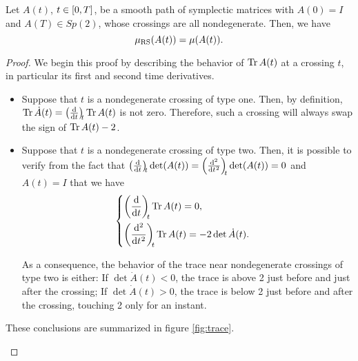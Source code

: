 \begin{prop}
Let $A(t)$, $t \in \interval0T$, be a smooth path of symplectic matrices with $A(0) = I$ and $A(T) \in Sp(2)$, whose crossings are all nondegenerate. Then, we have
\begin{equation}
\mu_{\mathrm{RS}}(A(t)) = \mu(A(t)).
\end{equation}
\end{prop}

\begin{proof}
We begin this proof by describing the behavior of $\operatorname{Tr} A(t)$ at a crossing $t$, in particular its first and second time derivatives.

\begin{itemize}
\item Suppose that $t$ is a nondegenerate crossing of type one. Then, by definition, $\trace \dot A(t) = \diff{}t[t] \trace A(t)$ is not zero. Therefore, such a crossing will always swap the sign of $\operatorname{Tr} A(t) - 2$.

\item Suppose that $t$ is a nondegenerate crossing of type two. Then, it is possible to verify from the fact that $\diff{}t[t] \det(A(t)) = \diff[2]{}t[t] \det(A(t)) = 0$ and $A(t) = I$ that we have
\begin{equation}
\begin{cases}
\displaystyle \diff{}t[t] \trace A(t) = 0,\\[1em]
\displaystyle \diff[2]{}t[t] \trace A(t) = - 2 \det \dot A(t).
\end{cases}
\end{equation}

As a consequence, the behavior of the trace near nondegenerate crossings of type two is either: If $\det \dot A(t) < 0$, the trace is above 2 just before and just after the crossing; If $\det \dot A(t) > 0$, the trace is below 2 just before and after the crossing, touching 2 only for an instant.
\end{itemize}

These conclusions are summarized in figure \ref{fig:trace}.
\begin{figure}
\centering
{}
\end{figure}
\end{proof}
